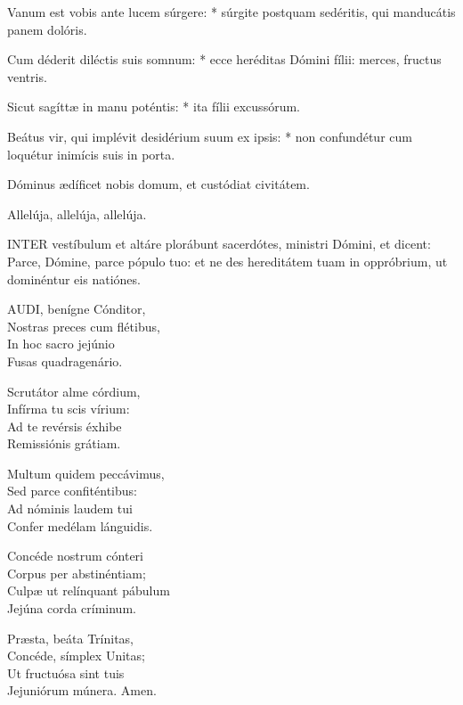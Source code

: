 Vanum est vobis ante lucem súrgere: * súrgite postquam sedéritis, qui manducátis panem dolóris.

Cum déderit diléctis suis somnum: * ecce heréditas Dómini fílii: merces, fructus ventris.

Sicut sagíttæ in manu poténtis: * ita fílii excussórum.

Beátus vir, qui implévit desidérium suum ex ipsis: * non confundétur cum loquétur inimícis suis in porta.


 Dóminus ædíficet nobis domum, et custódiat civitátem.


 Allelúja, allelúja, allelúja.




\lettrine[lines=2]{I}{NTER} vestíbulum et altáre plorábunt sacerdótes, ministri Dómini, et dicent: Parce, Dómine, parce pópulo tuo: et ne des hereditátem tuam in oppróbrium, ut dominéntur eis natiónes.


\lettrine[lines=2]{A}{UDI}, benígne Cónditor,\\
Nostras preces cum flétibus,\\
In hoc sacro jejúnio\\
Fusas quadragenário.

Scrutátor alme córdium,\\
Infírma tu scis vírium:\\
Ad te revérsis éxhibe\\
Remissiónis grátiam.

Multum quidem peccávimus,\\
Sed parce confiténtibus:\\
Ad nóminis laudem tui\\
Confer medélam lánguidis.

Concéde nostrum cónteri\\
Corpus per abstinéntiam;\\
Culpæ ut relínquant pábulum\\
Jejúna corda críminum.

Præsta, beáta Trínitas,\\
Concéde, símplex Unitas;\\
Ut fructuósa sint tuis\\
Jejuniórum múnera. Amen.

